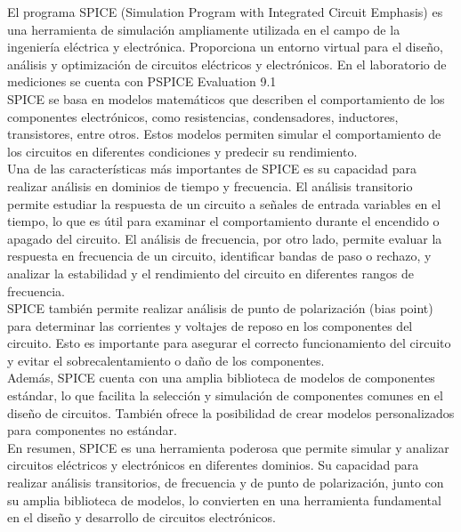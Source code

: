 \documentclass[12pt]{article}
\begin{document}
	El programa SPICE (Simulation Program with Integrated Circuit Emphasis) es una herramienta de simulación ampliamente utilizada en el campo de la ingeniería eléctrica y electrónica. Proporciona un entorno virtual para el diseño, análisis y optimización de circuitos eléctricos y electrónicos. En el laboratorio de mediciones se cuenta con PSPICE Evaluation 9.1\\
	
	SPICE se basa en modelos matemáticos que describen el comportamiento de los componentes electrónicos, como resistencias, condensadores, inductores, transistores, entre otros. Estos modelos permiten simular el comportamiento de los circuitos en diferentes condiciones y predecir su rendimiento.\\
	
	Una de las características más importantes de SPICE es su capacidad para realizar análisis en dominios de tiempo y frecuencia. El análisis transitorio permite estudiar la respuesta de un circuito a señales de entrada variables en el tiempo, lo que es útil para examinar el comportamiento durante el encendido o apagado del circuito. El análisis de frecuencia, por otro lado, permite evaluar la respuesta en frecuencia de un circuito, identificar bandas de paso o rechazo, y analizar la estabilidad y el rendimiento del circuito en diferentes rangos de frecuencia.\\
	
	SPICE también permite realizar análisis de punto de polarización (bias point) para determinar las corrientes y voltajes de reposo en los componentes del circuito. Esto es importante para asegurar el correcto funcionamiento del circuito y evitar el sobrecalentamiento o daño de los componentes.\\
	
	Además, SPICE cuenta con una amplia biblioteca de modelos de componentes estándar, lo que facilita la selección y simulación de componentes comunes en el diseño de circuitos. También ofrece la posibilidad de crear modelos personalizados para componentes no estándar.\\
	
	En resumen, SPICE es una herramienta poderosa que permite simular y analizar circuitos eléctricos y electrónicos en diferentes dominios. Su capacidad para realizar análisis transitorios, de frecuencia y de punto de polarización, junto con su amplia biblioteca de modelos, lo convierten en una herramienta fundamental en el diseño y desarrollo de circuitos electrónicos.\\
	
\end{document}
